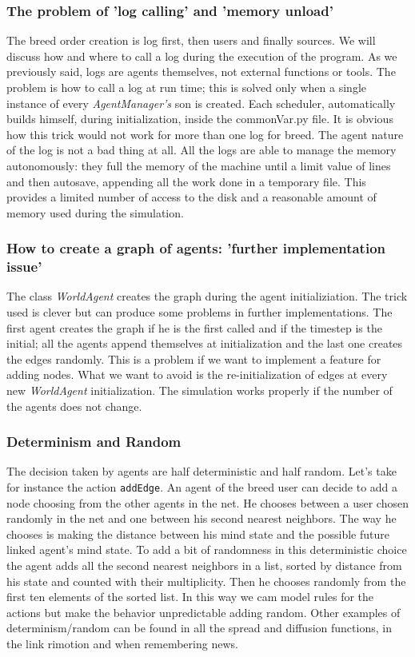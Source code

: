 \subsubsection{The problem of 'log calling' and 'memory unload'}
The breed order creation is log first, then users and finally sources.
We will discuss how and where to call a log during the execution of the program.
As we previously said, logs are agents themselves, not external functions
or tools. The problem is how to call a log at run time; this is solved
only when a single instance of every \textit{AgentManager's} son is
created. Each scheduler, automatically builds himself, during
initialization, inside the commonVar.py file. It is obvious how this trick
would not work for more than one log for breed.
The agent nature of the log is not a bad thing at all. All the logs are
able to manage the memory autonomously: they full the memory of the machine
until a limit value of lines and then autosave, appending all the work done
in a temporary file. This provides a limited number of access to the disk and
a reasonable amount of memory used during the simulation.

\subsubsection{How to create a graph of agents:
  'further implementation issue'}
The class \textit{WorldAgent} creates the graph during the agent
initializiation. The trick used is clever but can produce some
problems in further implementations. The first agent creates the graph
if he is the first called and if the timestep is the initial; all the
agents append themselves at initialization and the last one creates the edges
randomly. This is a problem if we want to implement a feature for adding nodes.
What we want to avoid is the re-initialization of edges at every new
\textit{WorldAgent} initialization. The simulation works properly if the
number of the agents does not change.

\subsubsection{Determinism and Random}
The decision taken by agents are half deterministic and half random.
Let's take for instance the action \texttt{addEdge}.
An agent of the breed user can decide to add a node choosing from the
other agents in the net.
He chooses between a user chosen randomly in the net and one between
his second nearest neighbors.
The way he chooses is making the distance between his mind state and the
possible future linked agent's mind state. To add a bit of randomness
in this deterministic choice the agent adds all the second nearest
neighbors in a list, sorted by distance from his state and counted
with their multiplicity. Then he chooses randomly from the first ten
elements of the sorted list. In this way we cam model rules for the
actions but make the behavior unpredictable adding random.
Other examples of determinism/random can be found in all the spread
and diffusion functions, in the link rimotion and when remembering news. 

